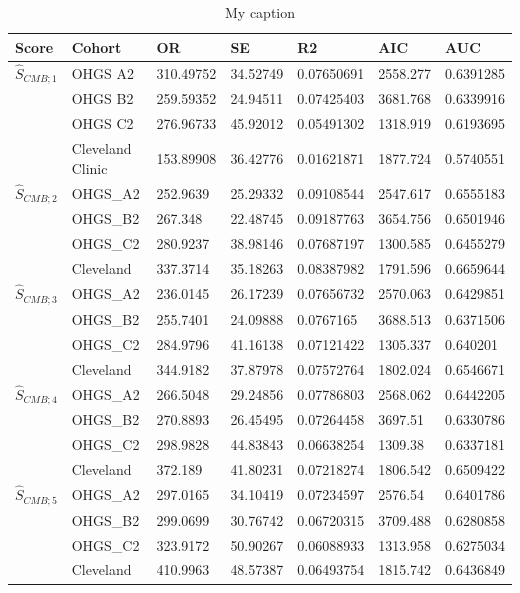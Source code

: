 \newpage

\begin{table}[H]
\centering
\caption{My caption}
\label{cmd-sum}
\begin{tabular}{lllllll}
\hline
Score & Cohort           & OR        & SE       & R2         & AIC      & AUC       \\ \hline
$\hat{S}_{CMB; 1}$     & OHGS A2          & 310.49752 & 34.52749 & 0.07650691 & 2558.277 & 0.6391285 \\
      & OHGS B2          & 259.59352 & 24.94511 & 0.07425403 & 3681.768 & 0.6339916 \\
      & OHGS C2          & 276.96733 & 45.92012 & 0.05491302 & 1318.919 & 0.6193695 \\
      & Cleveland Clinic & 153.89908 & 36.42776 & 0.01621871 & 1877.724 & 0.5740551 \\ \hline
$\hat{S}_{CMB; 2}$     & OHGS\_A2         & 252.9639  & 25.29332 & 0.09108544 & 2547.617 & 0.6555183 \\
      & OHGS\_B2         & 267.348   & 22.48745 & 0.09187763 & 3654.756 & 0.6501946 \\
      & OHGS\_C2         & 280.9237  & 38.98146 & 0.07687197 & 1300.585 & 0.6455279 \\
      & Cleveland        & 337.3714  & 35.18263 & 0.08387982 & 1791.596 & 0.6659644 \\ \hline
$\hat{S}_{CMB; 3}$     & OHGS\_A2         & 236.0145  & 26.17239 & 0.07656732 & 2570.063 & 0.6429851 \\
      & OHGS\_B2         & 255.7401  & 24.09888 & 0.0767165  & 3688.513 & 0.6371506 \\
      & OHGS\_C2         & 284.9796  & 41.16138 & 0.07121422 & 1305.337 & 0.640201  \\
      & Cleveland        & 344.9182  & 37.87978 & 0.07572764 & 1802.024 & 0.6546671 \\ \hline
$\hat{S}_{CMB; 4}$     & OHGS\_A2         & 266.5048  & 29.24856 & 0.07786803 & 2568.062 & 0.6442205 \\
      & OHGS\_B2         & 270.8893  & 26.45495 & 0.07264458 & 3697.51  & 0.6330786 \\
      & OHGS\_C2         & 298.9828  & 44.83843 & 0.06638254 & 1309.38  & 0.6337181 \\
      & Cleveland        & 372.189   & 41.80231 & 0.07218274 & 1806.542 & 0.6509422 \\ \hline
$\hat{S}_{CMB; 5}$     & OHGS\_A2         & 297.0165  & 34.10419 & 0.07234597 & 2576.54  & 0.6401786 \\
      & OHGS\_B2         & 299.0699  & 30.76742 & 0.06720315 & 3709.488 & 0.6280858 \\
      & OHGS\_C2         & 323.9172  & 50.90267 & 0.06088933 & 1313.958 & 0.6275034 \\
      & Cleveland        & 410.9963  & 48.57387 & 0.06493754 & 1815.742 & 0.6436849 \\ \hline
\end{tabular}
\end{table}

